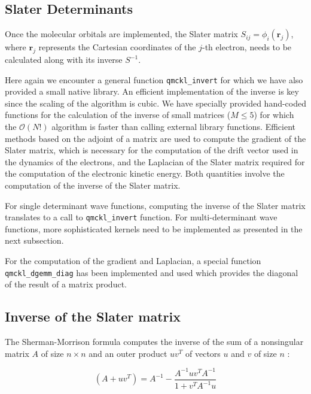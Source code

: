\subsection{Slater Determinants}

Once the molecular orbitals are implemented, the Slater matrix $S_{ij} = \phi_i(\mathbf{r}_j)$,
where $\mathbf{r}_j$ represents the Cartesian coordinates of the $j$-th electron, needs to be
calculated along with its inverse $S^{-1}$.
  
Here again we encounter a general  function
\texttt{qmckl_invert} for which we have also provided a small native
library. An efficient implementation of the inverse is key since the 
scaling of the algorithm is cubic. We have specially provided hand-coded functions for
the calculation of the inverse of small matrices ($M\le 5$) for which the
$\mathcal{O}(N!)$ algorithm is faster than calling external library functions.
Efficient methods based on the adjoint of a matrix \cite{MCMQC} are used to
compute the gradient of the Slater matrix, which is necessary for the 
computation of the drift vector used in the dynamics of the
electrons, and the Laplacian of the Slater matrix required for the computation of
the electronic kinetic energy. Both quantities involve the computation of
the inverse of the Slater matrix.

For single determinant wave functions, computing the inverse of the Slater
matrix translates to a call to \texttt{qmckl_invert} function. For
multi-determinant wave functions, more sophisticated kernels need to be
implemented as presented in the next subsection.

For the computation of the gradient and Laplacian, a special function
\texttt{qmckl_dgemm_diag} has been implemented and used which provides
the diagonal of the result of a matrix product. 

\subsection{Inverse of the Slater matrix}

The Sherman-Morrison formula computes the inverse of the sum of a
nonsingular matrix $A$ of size $n \times n$ and an outer product
$uv^T$ of vectors $u$ and $v$ of size $n$ :

\begin{equation}
    (A + uv^T) = A^{-1} - \frac{A^{-1} uv^T A^{-1}}{1 + v^T A^{-1} u}
    \label{eq:sherman}
\end{equation}

